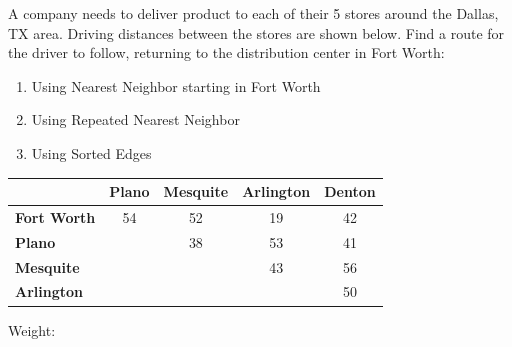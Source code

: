 \begin{stmt}
A company needs to deliver product to each of their 5 stores around the Dallas, TX area. Driving
distances between the stores are shown below. Find a route for the driver to follow, returning to
the distribution center in Fort Worth:

\begin{enumerate}[label=\alph*., nosep]
\item Using Nearest Neighbor starting in Fort Worth
\item Using Repeated Nearest Neighbor
\item Using Sorted Edges
\end{enumerate}

\begin{center}
\begin{tabular}{|l|c|c|c|c|}
\hline
& \textbf{Plano} & \textbf{Mesquite} & \textbf{Arlington} & \textbf{Denton} \\
\hline
\textbf{Fort Worth} & 54 & 52 & 19 & 42 \\
\textbf{Plano}      &    & 38 & 53 & 41 \\
\textbf{Mesquite}   &    &    & 43 & 56 \\
\textbf{Arlington}  &    &    &    & 50 \\
\hline
\end{tabular}
\end{center}
\end{stmt}

\begin{sol}
\begin{center}\end{center}

\vspace{0.3em}
Weight: 
\end{sol}

